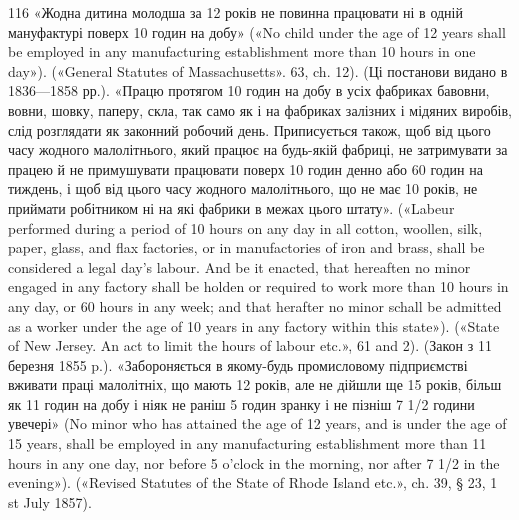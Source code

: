 116 «Жодна дитина молодша за 12 років не повинна працювати ні в
одній мануфактурі поверх 10 годин на добу» («No child under the age
of 12 years shall be employed in any manufacturing establishment more
than 10 hours in one day»). («General Statutes of Massachusetts». 63, ch. 12).
(Ці постанови видано в 1836—1858 рр.). «Працю протягом 10 годин на
добу в усіх фабриках бавовни, вовни, шовку, паперу, скла, так само як
і на фабриках залізних і мідяних виробів, слід розглядати як законний
робочий день. Приписується також, щоб від цього часу жодного малолітнього,
який працює на будь-якій фабриці, не затримувати за працею й
не примушувати працювати поверх 10 годин денно або 60 годин на тиждень,
і щоб від цього часу жодного малолітнього, що не має 10 років, не приймати
робітником ні на які фабрики в межах цього штату». («Labeur performed
during a period of 10 hours on any day in all cotton, woollen, silk,
paper, glass, and flax factories, or in manufactories of iron and brass,
shall be considered a legal day’s labour. And be it enacted, that hereaften
no minor engaged in any factory shall be holden or required to work more
than 10 hours in any day, or 60 hours in any week; and that herafter no
minor schall be admitted as a worker under the age of 10 years in any factory
within this state»). («State of New Jersey. An act to limit the hours of labour
etc.», 61 and 2). (Закон з 11 березня 1855 p.). «Забороняється в якому-будь
промисловому підприємстві вживати праці малолітніх, що мають
12 років, але не дійшли ще 15 років, більш як 11 годин на добу і ніяк не
раніш 5 годин зранку і не пізніш 7 1/2 години увечері» (No minor who has
attained the age of 12 years, and is under the age of 15 years, shall be employed
in any manufacturing establishment more than 11 hours in any one day,
nor before 5 o’clock in the morning, nor after 7 1/2 in the evening»). («Revised
Statutes of the State of Rhode Island etc.», ch. 39, § 23, 1 st July 1857).
